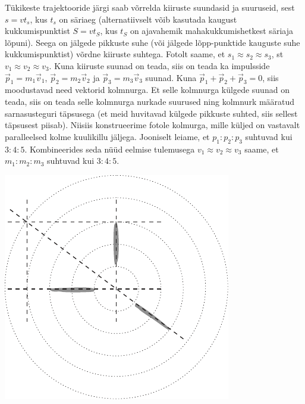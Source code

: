 {\ifSolution
Tükikeste trajektooride järgi saab võrrelda kiiruste suundasid ja suuruseid, sest $s = vt_s$, kus $t_s$ on säriaeg (alternatiivselt võib kasutada kaugust kukkumispunktist $S = vt_S$, kus $t_S$ on ajavahemik mahakukkumishetkest säriaja lõpuni). Seega on jälgede pikkuste suhe (või jälgede lõpp-punktide kauguste suhe kukkumispunktist) võrdne kiiruste suhtega. Fotolt saame, et $s_1 \approx s_2 \approx s_3$, st $v_1 \approx v_2 \approx v_3$. Kuna kiiruste suunad on teada, siis on teada ka impulsside $\vec p_1 = m_1\vec v_1$, $\vec p_2 = m_2\vec v_2$ ja $\vec p_3 = m_3\vec v_3$ suunad. Kuna $\vec p_1 + \vec p_2 + \vec p_3 = 0$, siis moodustavad need vektorid kolmnurga. Et selle kolmnurga külgede suunad on teada, siis on teada selle kolmnurga nurkade suurused ning kolmnurk määratud sarnasusteguri täpsusega (et meid huvitavad külgede pikkuste suhted, siis sellest täpsusest piisab). Niisiis konstrueerime fotole kolmurga, mille küljed on vastavalt paralleelsed kolme kuulikillu jäljega. Jooniselt leiame, et $p_1 : p_2 : p_3$ suhtuvad kui $3 : 4 : 5$. Kombineerides seda nüüd eelmise tulemusega $v_1 \approx v_2 \approx v_3$ saame, et $m_1 : m_2 : m_3$ suhtuvad kui $3 : 4 : 5$.
\begin{center}
	\includegraphics[width=0.6\linewidth]{2008-v2g-06-lah}
\end{center}
\fi
}